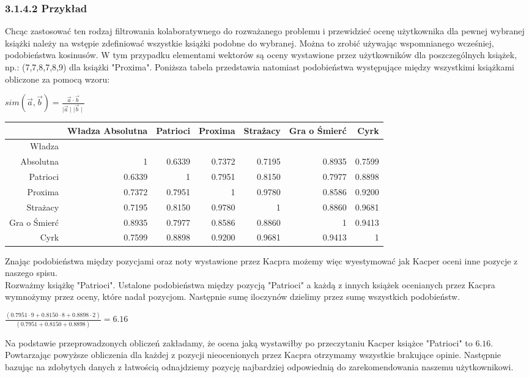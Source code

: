 \documentclass[12pt,a4paper]{report}
\begin{document}
\subsubsection{3.1.4.2 Przykład}
Chcąc zastosować ten rodzaj filtrowania kolaboratywnego do rozważanego problemu i przewidzieć ocenę użytkownika dla pewnej wybranej książki należy na wstępie zdefiniować wszystkie książki podobne do wybranej. Można to zrobić używając wspomnianego wcześniej, podobieństwa kosinusów. W tym przypadku elementami wektorów są oceny wystawione przez użytkowników dla poszczególnych książek, np.: (7,7,8,7,8,9) dla książki "Proxima". Poniższa tabela przedstawia natomiast podobieństwa występujące między wszystkimi książkami obliczone za pomocą wzoru:
\begin{center}
$ sim (\vec{a},\vec{b}) = \frac{\vec{a} \cdot \vec{b}}{\mid \vec{a} \mid \mid \vec{b} \mid }$
\end{center}
\begin{center}
\footnotesize{
\begin{tabular}{|r|r|r|r|r|r|r|} \hline
 & Władza Absolutna & Patrioci & Proxima & Strażacy & Gra o Śmierć & Cyrk \\
\hline
Władza & & & & & & \\
Absolutna & 1 & 0.6339 & 0.7372 & 0.7195 & 0.8935 & 0.7599 \\
\hline
Patrioci & 0.6339 & 1 & 0.7951 & 0.8150 & 0.7977 & 0.8898 \\
\hline
Proxima & 0.7372 & 0.7951 & 1 & 0.9780 & 0.8586 & 0.9200 \\
\hline
Strażacy & 0.7195 & 0.8150 & 0.9780 & 1 & 0.8860 & 0.9681 \\
\hline
Gra o Śmierć & 0.8935 & 0.7977 & 0.8586 & 0.8860 & 1 & 0.9413 \\
\hline
Cyrk & 0.7599 & 0.8898 & 0.9200 & 0.9681 & 0.9413 & 1 \\
\hline
\end{tabular}
}
\end{center}
Znając podobieństwa między pozycjami oraz noty wystawione przez Kacpra możemy więc wyestymować jak Kacper oceni inne pozycje z naszego spisu. 
\\Rozważmy książkę "Patrioci". Ustalone podobieństwa między pozycją "Patrioci" a każdą z innych książek ocenianych przez Kacpra wymnożymy przez oceny, które nadał pozycjom. Następnie sumę iloczynów dzielimy przez sumę wszystkich podobieństw.
\begin{center}
$\frac{(0.7951 \cdot 9 + 0.8150 \cdot 8 + 0.8898 \cdot 2)}{(0.7951 + 0.8150 + 0.8898)} = 6.16 $
\end{center}
Na podstawie przeprowadzonych obliczeń zakładamy, że ocena jaką wystawiłby po przeczytaniu Kacper książce "Patrioci" to $6.16$.
Powtarzając powyższe obliczenia dla każdej z pozycji nieocenionych przez Kacpra otrzymamy wszystkie brakujące opinie. Następnie bazując na zdobytych danych z łatwością odnajdziemy pozycję najbardziej odpowiednią do zarekomendowania naszemu użytkownikowi.
\end{document}
